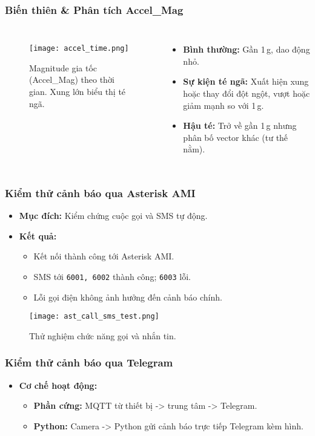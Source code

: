 \begin{frame}[t,fragile]
\frametitle{Biến thiên & Phân tích Accel\_Mag}
\begin{columns}[T]
    \begin{figure}[H]
        \centering
        \texttt{[image: accel\_time.png]}
        \caption{Magnitude gia tốc (Accel\_Mag) theo thời gian. Xung lớn biểu thị té ngã.}
    \end{figure}
    \begin{itemize}
        \item \textbf{Bình thường:} Gần 1\,g, dao động nhỏ.
        \item \textbf{Sự kiện té ngã:} Xuất hiện xung hoặc thay đổi đột ngột, vượt hoặc giảm mạnh so với 1\,g.
        \item \textbf{Hậu té:} Trở về gần 1\,g nhưng phân bố vector khác (tư thế nằm).
    \end{itemize}
\end{columns}
\end{frame}
\begin{frame}[fragile]
\frametitle{Kiểm thử cảnh báo qua Asterisk AMI}
\begin{itemize}
    \item \textbf{Mục đích:} Kiểm chứng cuộc gọi và SMS tự động.
    \item \textbf{Kết quả:}
    \begin{itemize}
        \item Kết nối thành công tới Asterisk AMI.
        \item SMS tới \texttt{6001, 6002} thành công; \texttt{6003} lỗi.
        \item Lỗi gọi điện không ảnh hưởng đến cảnh báo chính.
    \end{itemize}
\end{itemize}
\begin{figure}[H]
    \centering
    \texttt{[image: ast\_call\_sms\_test.png]}
    \caption{Thử nghiệm chức năng gọi và nhắn tin.}
\end{figure}
\end{frame}

\begin{frame}[t,fragile]
\frametitle{Kiểm thử cảnh báo qua Telegram}
\begin{itemize}
    \item \textbf{Cơ chế hoạt động:}
    \begin{itemize}
        \item \textbf{Phần cứng:} MQTT từ thiết bị -> trung tâm -> Telegram.
        \item \textbf{Python:} Camera -> Python gửi cảnh báo trực tiếp Telegram kèm hình.
    \end{itemize}
\end{itemize}
\end{frame}

